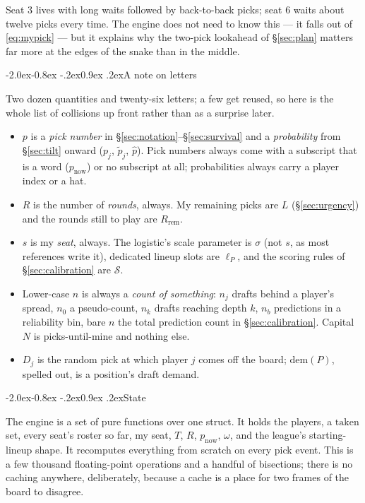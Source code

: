 \documentclass[10pt,a4paper]{article}
\makeatletter
\theoremstyle{plain}
\theoremstyle{definition}
\theoremstyle{remark}
\renewcommand\subsection{\@startsection{subsection}{2}{\z@}%
  {-2.0ex\@plus -0.8ex \@minus -.2ex}{0.9ex \@plus .2ex}{\normalfont\large\bfseries}}
\makeatother
\begin{document}
Seat 3 lives with long waits followed by
back-to-back picks; seat 6 waits about twelve picks every time. The engine does not
need to know this --- it falls out of \eqref{eq:mypick} --- but it explains why the
two-pick lookahead of \S\ref{sec:plan} matters far more at the edges of the snake than
in the middle.

\subsection{A note on letters}

Two dozen quantities and twenty-six letters; a few get reused, so here is the whole list
of collisions up front rather than as a surprise later.

\begin{itemize}
\item $p$ is a \emph{pick number} in \S\ref{sec:notation}--\S\ref{sec:survival} and a
\emph{probability} from \S\ref{sec:tilt} onward ($p_j$, $\tilde p_j$, $\hat p$). Pick
numbers always come with a subscript that is a word ($p_{\text{now}}$) or no subscript at
all; probabilities always carry a player index or a hat.
\item $R$ is the number of \emph{rounds}, always. My remaining picks are $L$
(\S\ref{sec:urgency}) and the rounds still to play are $R_{\text{rem}}$.
\item $s$ is my \emph{seat}, always. The logistic's scale parameter is $\sigma$ (not $s$,
as most references write it), dedicated lineup slots are $\ell_P$, and the scoring rules
of \S\ref{sec:calibration} are $\mathcal{S}$.
\item Lower-case $n$ is always a \emph{count of something}: $n_j$ drafts behind a
player's spread, $n_0$ a pseudo-count, $n_k$ drafts reaching depth $k$, $n_b$ predictions
in a reliability bin, bare $n$ the total prediction count in \S\ref{sec:calibration}.
Capital $N$ is picks-until-mine and nothing else.
\item $D_j$ is the random pick at which player $j$ comes off the board;
$\mathrm{dem}(P)$, spelled out, is a position's draft demand.
\end{itemize}

\subsection{State}

The engine is a set of pure functions over one struct. It holds the players, a
$\mathrm{taken}$ set, every seat's roster so far, my seat, $T$, $R$, $p_{\text{now}}$,
$\omega$, and the league's starting-lineup shape. It recomputes everything from scratch
on every pick event. This is a few thousand floating-point operations and a handful of
bisections; there is no caching anywhere, deliberately, because a cache is a place for
two frames of the board to disagree.
\end{document}
